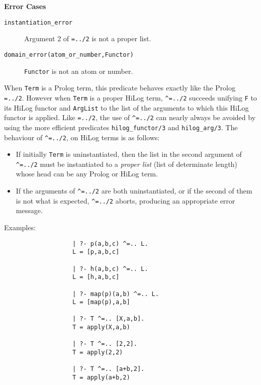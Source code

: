 \begin{description}
{\bf Error Cases}
     \begin{description}
     \item[{\tt instantiation\_error}]
	Argument 2 of {\tt =../2} is not a proper list.
     \item[{\tt domain\_error(atom\_or\_number,Functor)}]
	{\tt Functor} is not an atom or number.
     \end{description}


    When {\tt Term} is a Prolog term, this predicate behaves exactly like
    the Prolog {\tt =../2}. However when {\tt Term} is a proper HiLog term, 
    {\tt \verb|^|=../2} 
    succeeds unifying {\tt F} to its HiLog functor and {\tt ArgList} to the 
    list of the arguments to which this HiLog functor is applied. Like 
    {\tt =../2}, the use of {\tt \verb|^|=../2} can nearly always be avoided
    by using the more efficient predicates {\tt hilog\_functor/3} and 
    {\tt hilog\_arg/3}. The behaviour of {\tt \verb|^|=../2}, on HiLog terms 
    is as follows:
    \begin{itemize}
    \item If initially {\tt Term} is uninstantiated, then the list in the 
          second argument of {\tt \verb|^|=../2} must be instantiated to 
          a {\em proper list} (list of determinate length) whose head can 
          be any Prolog or HiLog term.
    \item If the arguments of {\tt \verb|^|=../2} are both uninstantiated, 
          or if the second of them is not what is expected, 
          {\tt \verb|^|=../2} aborts, producing an appropriate error message.
    \end{itemize}
    Examples:
    {\footnotesize
     \begin{verbatim}
                   | ?- p(a,b,c) ^=.. L.
                   L = [p,a,b,c]

                   | ?- h(a,b,c) ^=.. L.
                   L = [h,a,b,c]

                   | ?- map(p)(a,b) ^=.. L.
                   L = [map(p),a,b]

                   | ?- T ^=.. [X,a,b].
                   T = apply(X,a,b)

                   | ?- T ^=.. [2,2].
                   T = apply(2,2)

                   | ?- T ^=.. [a+b,2].
                   T = apply(a+b,2)


\end{verbatim}}
\end{description}
